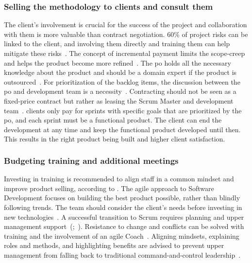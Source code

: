 \subsubsection*{Selling the methodology to clients and consult them}\label{subsubsec:SellingScrum}
The client's involvement is crucial for the success of the project and collaboration with them is more valuable than contract negotiation. 60\% of project risks can be linked to the client, and involving them directly and training them can help mitigate these risks~\cite[p.~5]{Coyle2009Acs}. The concept of incremental payment limits the \gls{scope-creep} and helps the product become more refined~\cite{Beck2001MfA}. The \ac{po} holds all the necessary knowledge about the product and should be a domain expert if the product is outsourced~\cite[p.~180]{Rubin2012ESA}. For prioritization of the backlog items, the discussion between the \ac{po} and development team is a necessity~\cite[p.~2]{Rajasekaran2015IiS}. Contracting should not be seen as a fixed-price contract but rather as leasing the Scrum Master and development team~\cite[p.~180]{Rubin2012ESA}. \Glspl{client} only pay for sprints with specific goals that are prioritized by the \ac{po}, and each sprint must be a functional product. The \gls{client} can end the development at any time and keep the functional product developed until then. This results in the right product being built and higher \gls{client} satisfaction.

\subsubsection*{Budgeting training and additional meetings}\label{subsubsec:BudgetingTrainging}
Investing in training is recommended to align staff in a common \gls{mindset} and improve product selling, according to . The \gls{agile} approach to Software Development focuses on building the best product possible, rather than blindly following trends. The team should consider the client's needs before investing in new technologies~\cite[p.~43]{Maximini2018ISi}. A successful \gls{transition} to Scrum requires planning and upper management support~(;~). Resistance to change and conflicts can be solved with training and the involvement of an \gls{agile} Coach~\cite[p.~21]{Naseem2009Saa}. Aligning \glspl{mindset}, explaining roles and \glspl{method}, and highlighting benefits are advised to prevent upper management from falling back to traditional command-and-control leadership~\cite{Moreira2013AtA}.

